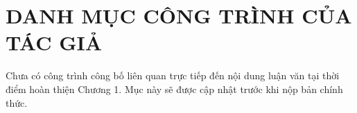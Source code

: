 \clearpage
\chapter*{DANH MỤC CÔNG TRÌNH CỦA TÁC GIẢ}

Chưa có công trình công bố liên quan trực tiếp đến nội dung luận văn tại thời điểm hoàn thiện Chương 1. Mục này sẽ được cập nhật trước khi nộp bản chính thức.
